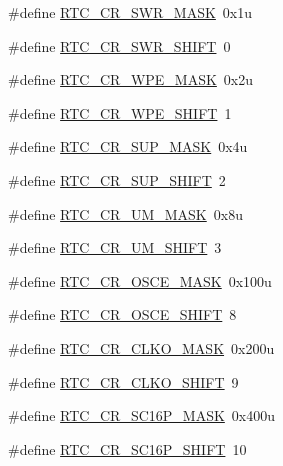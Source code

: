 \begin{DoxyCompactItemize}
\item 
\#define \hyperlink{group___r_t_c___register___masks_ga114a670a6ac2782bd777ea33e4395059}{R\+T\+C\+\_\+\+C\+R\+\_\+\+S\+W\+R\+\_\+\+M\+A\+SK}~0x1u
\item 
\#define \hyperlink{group___r_t_c___register___masks_gac0a88898cc6e1686b54a99e3a6fe759d}{R\+T\+C\+\_\+\+C\+R\+\_\+\+S\+W\+R\+\_\+\+S\+H\+I\+FT}~0
\item 
\#define \hyperlink{group___r_t_c___register___masks_gade2b0c86902f83d7674c10e3a7923f80}{R\+T\+C\+\_\+\+C\+R\+\_\+\+W\+P\+E\+\_\+\+M\+A\+SK}~0x2u
\item 
\#define \hyperlink{group___r_t_c___register___masks_ga319f4682f30aed777eecac4c09a96223}{R\+T\+C\+\_\+\+C\+R\+\_\+\+W\+P\+E\+\_\+\+S\+H\+I\+FT}~1
\item 
\#define \hyperlink{group___r_t_c___register___masks_ga762afd0d0e0bbc08b631a10c45222797}{R\+T\+C\+\_\+\+C\+R\+\_\+\+S\+U\+P\+\_\+\+M\+A\+SK}~0x4u
\item 
\#define \hyperlink{group___r_t_c___register___masks_gacf42f5f0dc8f3939de4131b7b63d0dc2}{R\+T\+C\+\_\+\+C\+R\+\_\+\+S\+U\+P\+\_\+\+S\+H\+I\+FT}~2
\item 
\#define \hyperlink{group___r_t_c___register___masks_gae071fafa245264dd485258198b7fcf8a}{R\+T\+C\+\_\+\+C\+R\+\_\+\+U\+M\+\_\+\+M\+A\+SK}~0x8u
\item 
\#define \hyperlink{group___r_t_c___register___masks_ga71fb55b262a9f0aac1777b4115a1bfa7}{R\+T\+C\+\_\+\+C\+R\+\_\+\+U\+M\+\_\+\+S\+H\+I\+FT}~3
\item 
\#define \hyperlink{group___r_t_c___register___masks_ga1517078d0ce615b7feb94ef57b28e4c8}{R\+T\+C\+\_\+\+C\+R\+\_\+\+O\+S\+C\+E\+\_\+\+M\+A\+SK}~0x100u
\item 
\#define \hyperlink{group___r_t_c___register___masks_ga9d52da825519dde1888921fb1b5e096d}{R\+T\+C\+\_\+\+C\+R\+\_\+\+O\+S\+C\+E\+\_\+\+S\+H\+I\+FT}~8
\item 
\#define \hyperlink{group___r_t_c___register___masks_ga4c9ab830040b30f5ebc3e21f357e3d58}{R\+T\+C\+\_\+\+C\+R\+\_\+\+C\+L\+K\+O\+\_\+\+M\+A\+SK}~0x200u
\item 
\#define \hyperlink{group___r_t_c___register___masks_ga0c53e02399574c63f5015cef513dddff}{R\+T\+C\+\_\+\+C\+R\+\_\+\+C\+L\+K\+O\+\_\+\+S\+H\+I\+FT}~9
\item 
\#define \hyperlink{group___r_t_c___register___masks_ga885a0abaf0aeae2525406950542df145}{R\+T\+C\+\_\+\+C\+R\+\_\+\+S\+C16\+P\+\_\+\+M\+A\+SK}~0x400u
\item 
\#define \hyperlink{group___r_t_c___register___masks_gafefab96f792c2faf1c4580790af7a1c5}{R\+T\+C\+\_\+\+C\+R\+\_\+\+S\+C16\+P\+\_\+\+S\+H\+I\+FT}~10

\end{DoxyCompactItemize}
